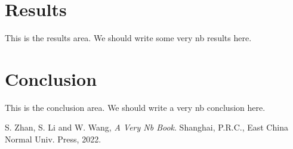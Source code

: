 \documentclass[lettersize,journal,12pt]{IEEEtran}
\begin{document}
\section{Results}

This is the results area. We should write some very nb results here.

\section{Conclusion}

This is the conclusion area. We should write a very nb conclusion here.



\begin{thebibliography}{1}

	S. Zhan, S. Li and W. Wang, {\it{A Very Nb Book}}. Shanghai, P.R.C., East China Normal  Univ. Press, 2022.

\end{thebibliography}
\end{document}
